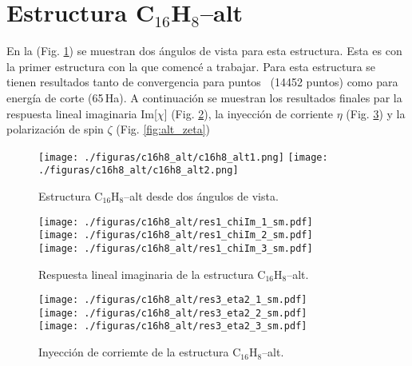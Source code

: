 \documentclass[11pt]{article}
\begin{document}
\newpage

\section{Estructura C$_{16}$H$_{8}$--alt}\label{section:alt}

En la (Fig. \ref{fig:alt_struct}) se muestran dos \'angulos de vista para esta estructura. Esta es con la primer estructura con la que comenc\'e a trabajar. Para esta estructura se tienen resultados tanto de convergencia para puntos \vk \ (14452 puntos) como para energ\'ia de corte (65\,Ha). A continuaci\'on se muestran los resultados finales par la respuesta lineal imaginaria Im[$\chi$] (Fig. \ref{fig:alt_Imchi}), la inyecci\'on  de corriente $\eta$ (Fig. \ref{fig:alt_eta}) y la polarizaci\'on  de spin $\zeta$ (Fig. \ref{fig:alt_zeta})

\begin{figure}[h!]
	\begin{center}
		\texttt{[image: ./figuras/c16h8\_alt/c16h8\_alt1.png]}
		\texttt{[image: ./figuras/c16h8\_alt/c16h8\_alt2.png]}
	\end{center}
	\caption{Estructura C$_{16}$H$_{8}$--alt desde dos \'angulos de vista.}
	\label{fig:alt_struct}
\end{figure}


\begin{figure}[]
	\begin{center}
		\texttt{[image: ./figuras/c16h8\_alt/res1\_chiIm\_1\_sm.pdf]}\\
		\texttt{[image: ./figuras/c16h8\_alt/res1\_chiIm\_2\_sm.pdf]}\\
		\texttt{[image: ./figuras/c16h8\_alt/res1\_chiIm\_3\_sm.pdf]}
	\end{center}
	\caption{Respuesta lineal imaginaria  de la estructura C$_{16}$H$_{8}$--alt.}
	\label{fig:alt_Imchi}
\end{figure}

\begin{figure}[]
	\begin{center}
		\texttt{[image: ./figuras/c16h8\_alt/res3\_eta2\_1\_sm.pdf]}\\
		\texttt{[image: ./figuras/c16h8\_alt/res3\_eta2\_2\_sm.pdf]}\\
		\texttt{[image: ./figuras/c16h8\_alt/res3\_eta2\_3\_sm.pdf]}
	\end{center}
	\caption{Inyecci\'on de corriemte  de la estructura C$_{16}$H$_{8}$--alt.}
	\label{fig:alt_eta}
\end{figure}
\end{document}
